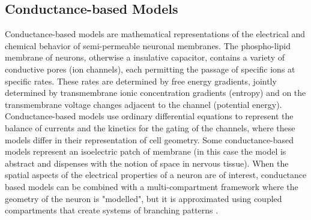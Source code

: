 \subsection{Conductance-based Models}
Conductance-based models are mathematical representations of the electrical and chemical behavior of semi-permeable neuronal membranes.
The phospho-lipid membrane of neurons, otherwise a insulative capacitor, contains a variety of conductive pores (ion channels), each permitting the passage of specific ions at specific rates.
These rates are determined by free energy gradients, jointly determined by transmembrane ionic concentration gradients (entropy) and on the transmembrane voltage changes adjacent to the channel (potential energy). Conductance-based models use ordinary differential equations to represent the balance of currents and the kinetics for the gating of the channels, where these models differ in their representation of cell geometry. Some conductance-based models represent an isoelectric patch of membrane (in this case the model is abstract and dispenses with the notion of space in nervous tissue).
When the spatial aspects of the electrical properties of a neuron are of interest, conductance based models can be combined with a multi-compartment framework where the geometry of the neuron is "modelled", but it is approximated using coupled compartments that create systems of branching patterns \citep{rall1962electrophysiology, hodgkin1952quantitative}.

